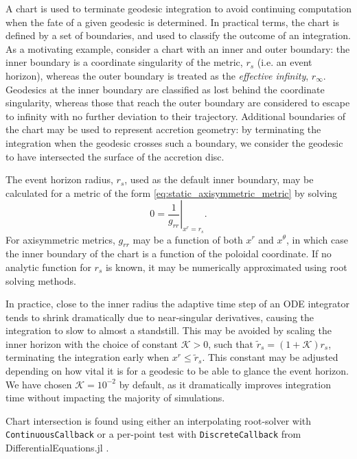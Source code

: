 A chart is used to terminate geodesic integration to avoid continuing computation when the fate of a given geodesic is determined. In practical terms, the chart is defined by a set of boundaries, and used to classify the outcome of an integration. As a motivating example, consider a chart with an inner and outer boundary: the inner boundary is a coordinate singularity of the metric, $r_s$ (i.e. an event horizon), whereas the outer boundary is treated as the \textit{effective infinity}, $r_\infty$. Geodesics at the inner boundary are classified as lost behind the coordinate singularity, whereas those that reach the outer boundary are considered to escape to infinity with no further deviation to their trajectory. Additional boundaries of the chart may be used to represent accretion geometry: by terminating the integration when the geodesic crosses such a boundary, we consider the geodesic to have intersected the surface of the accretion disc. 

The event horizon radius, $r_s$, used as the default inner boundary, may be calculated for a metric of the form \eqref{eq:static_axisymmetric_metric} by solving
\begin{equation}
    \label{eq:event_horizon}
    0 = \left. \frac{1}{g_{rr}} \right\rvert_{x^r = r_s}.
\end{equation}
For axisymmetric metrics, $g_{rr}$ may be a function of both $x^r$ and $x^\theta$, in which case the inner boundary of the chart is a function of the poloidal coordinate. If no analytic function for $r_s$ is known, it may be numerically approximated using root solving methods.

In practice, close to the inner radius the adaptive time step of an ODE integrator tends to shrink dramatically due to near-singular derivatives, causing the integration to slow to almost a standstill. This may be avoided by scaling the inner horizon with the choice of constant $\mathcal{K} > 0$, such that $\tilde{r}_s = (1 + \mathcal{K}) r_s$, terminating the integration early when $x^r \leq \tilde{r}_s$. This constant may be adjusted depending on how vital it is for a geodesic to be able to glance the event horizon. We have chosen $\mathcal{K} = 10^{-2}$ by default, as it dramatically improves integration time without impacting the majority of simulations. 

Chart intersection is found using either an interpolating root-solver with \texttt{ContinuousCallback} or a per-point test with \texttt{DiscreteCallback} from DifferentialEquations.jl \citep{}.


